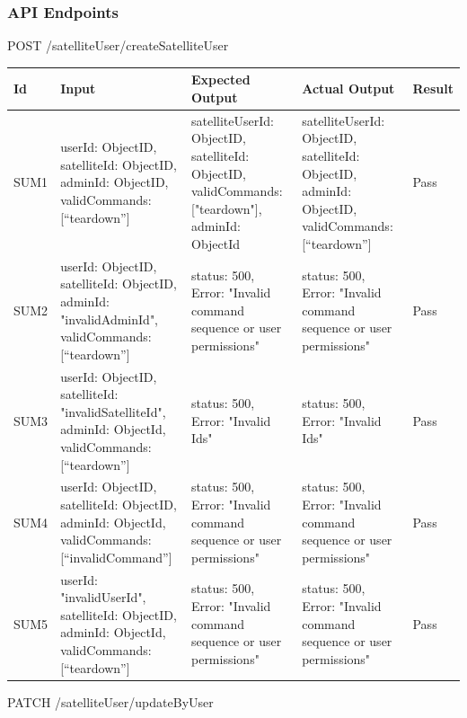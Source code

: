 \documentclass[12pt, titlepage]{article}
\begin{document}
\subsubsection{API Endpoints}


POST /satelliteUser/createSatelliteUser


\begin{center}
\begin{tabular}{|p{1cm} | p{3cm} |p{2cm}| p{2cm} |p{2cm}|}
\hline
\textbf{Id}  & \textbf{Input} & \textbf{Expected Output} & \textbf{Actual Output} & \textbf{Result} \\
\hline
SUM1 &  { userId: ObjectID,
satelliteId: ObjectID,
adminId: ObjectID,
validCommands: [“teardown”] } & { satelliteUserId: ObjectID,
satelliteId: ObjectID,
validCommands: ["teardown"],
adminId: ObjectId } & { satelliteUserId: ObjectID,
satelliteId: ObjectID,
adminId: ObjectID,
validCommands: [“teardown”] } & Pass
\\
\hline
SUM2 &  { userId: ObjectID,
satelliteId: ObjectID, adminId: "invalidAdminId",
validCommands: [“teardown”] } 
& { status: 500,
Error: "Invalid command sequence or user permissions" }
 & { status: 500,
Error: "Invalid command sequence or user permissions" }
 & Pass
\\
\hline
SUM3 &  { userId: ObjectID,
satelliteId: "invalidSatelliteId",
adminId: ObjectId,
validCommands: [“teardown”] }
 & { status: 500,
Error: "Invalid Ids" }
 & { status: 500,
Error: "Invalid Ids" }
 & Pass
\\
\hline
SUM4 &  { userId: ObjectID,
satelliteId: ObjectID,
adminId: ObjectId,
validCommands: [“invalidCommand”] }
 & { status: 500,
Error: "Invalid command sequence or user permissions" }
 & { status: 500,
Error: "Invalid command sequence or user permissions" }
 & Pass
\\
\hline
SUM5 &  { userId: "invalidUserId",
satelliteId: ObjectID,
adminId: ObjectId,
validCommands: [“teardown”] }
 & { status: 500,
Error: "Invalid command sequence or user permissions" }
 & { status: 500,
Error: "Invalid command sequence or user permissions" }
 & Pass
\\
\hline

\end{tabular}

\end{center}
PATCH /satelliteUser/updateByUser
\end{document}
